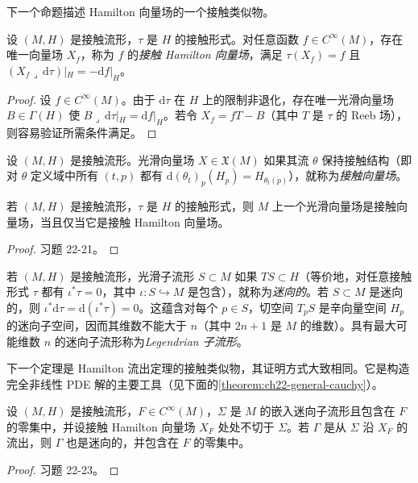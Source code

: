 \documentclass[../../main.tex]{subfiles}
\begin{document}
下一个命题描述 Hamilton 向量场的一个接触类似物。

\begin{proposition}\label{proposition:ch22-contact-hamiltonian}
设 $(M,H)$ 是接触流形，$\tau$ 是 $H$ 的接触形式。对任意函数 $f\in C^\infty(M)$，存在唯一向量场 $X_f$，称为 $f$ 的\emph{接触 Hamilton 向量场}，满足 $\tau(X_f)=f$ 且 $(X_f\lrcorner\,\mathrm{d}\tau)|_H=-\mathrm{d}f|_H$。
\end{proposition}

\begin{proof}
设 $f\in C^\infty(M)$。由于 $\mathrm{d}\tau$ 在 $H$ 上的限制非退化，存在唯一光滑向量场 $B\in\Gamma(H)$ 使 $B\lrcorner\,\mathrm{d}\tau|_H=\mathrm{d}f|_H$。若令 $X_f=fT-B$（其中 $T$ 是 $\tau$ 的 Reeb 场），则容易验证所需条件满足。
\end{proof}

设 $(M,H)$ 是接触流形。光滑向量场 $X\in\mathfrak X(M)$ 如果其流 $\theta$ 保持接触结构（即对 $\theta$ 定义域中所有 $(t,p)$ 都有 $\mathrm{d}(\theta_t)_p(H_p)=H_{\theta_t(p)}$），就称为\emph{接触向量场}。

\begin{theorem}[接触向量场的刻画]\label{theorem:ch22-contact-vector-field}
若 $(M,H)$ 是接触流形，$\tau$ 是 $H$ 的接触形式，则 $M$ 上一个光滑向量场是接触向量场，当且仅当它是接触 Hamilton 向量场。
\end{theorem}

\begin{proof}
习题 22-21。
\end{proof}

若 $(M,H)$ 是接触流形，光滑子流形 $S\subset M$ 如果 $TS\subset H$（等价地，对任意接触形式 $\tau$ 都有 $\iota^*\tau=0$，其中 $\iota:S\hookrightarrow M$ 是包含），就称为\emph{迷向的}。若 $S\subset M$ 是迷向的，则 $\iota^*\mathrm{d}\tau=\mathrm{d}(\iota^*\tau)=0$。这蕴含对每个 $p\in S$，切空间 $T_pS$ 是辛向量空间 $H_p$ 的迷向子空间，因而其维数不能大于 $n$（其中 $2n+1$ 是 $M$ 的维数）。具有最大可能维数 $n$ 的迷向子流形称为\emph{Legendrian 子流形}。

下一个定理是 Hamilton 流出定理的接触类似物，其证明方式大致相同。它是构造完全非线性 PDE 解的主要工具（见下面的\cref{theorem:ch22-general-cauchy}）。

\begin{theorem}[接触流出定理]\label{theorem:ch22-contact-flowout}
设 $(M,H)$ 是接触流形，$F\in C^\infty(M)$，$\Sigma$ 是 $M$ 的嵌入迷向子流形且包含在 $F$ 的零集中，并设接触 Hamilton 向量场 $X_F$ 处处不切于 $\Sigma$。若 $\Gamma$ 是从 $\Sigma$ 沿 $X_F$ 的流出，则 $\Gamma$ 也是迷向的，并包含在 $F$ 的零集中。
\end{theorem}

\begin{proof}
习题 22-23。
\end{proof}
\end{document}

